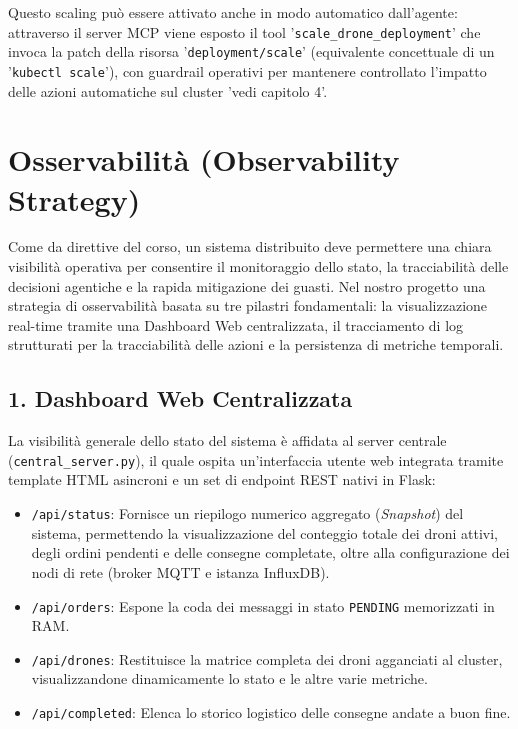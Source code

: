 Questo scaling può essere attivato anche in modo automatico dall’agente: attraverso il server MCP viene esposto il tool '\texttt{scale\_drone\_deployment}' che invoca la patch della risorsa '\texttt{deployment/scale}' (equivalente concettuale di un '\texttt{kubectl scale}'), con guardrail operativi per mantenere controllato l'impatto delle azioni automatiche sul cluster 'vedi capitolo 4'.

\section{Osservabilità (Observability Strategy)}
\label{sec:osservabilita}
Come da direttive del corso, un sistema distribuito deve permettere una chiara visibilità operativa per consentire il monitoraggio dello stato, la tracciabilità delle decisioni agentiche e la rapida mitigazione dei guasti. Nel nostro progetto una strategia di osservabilità basata su tre pilastri fondamentali: la visualizzazione real-time tramite una Dashboard Web centralizzata, il tracciamento di log strutturati per la tracciabilità delle azioni e la persistenza di metriche temporali.

\subsection*{1. Dashboard Web Centralizzata}
La visibilità generale dello stato del sistema è affidata al server centrale (\texttt{central\_server.py}), il quale ospita un'interfaccia utente web integrata tramite template HTML asincroni e un set di endpoint REST nativi in Flask: 

\begin{itemize}
    \item \texttt{/api/status}: Fornisce un riepilogo numerico aggregato (\textit{Snapshot}) del sistema, permettendo la visualizzazione del conteggio totale dei droni attivi, degli ordini pendenti e delle consegne completate, oltre alla configurazione dei nodi di rete (broker MQTT e istanza InfluxDB).
    \item \texttt{/api/orders}: Espone la coda dei messaggi in stato \texttt{PENDING} memorizzati in RAM.
    \item \texttt{/api/drones}: Restituisce la matrice completa dei droni agganciati al cluster, visualizzandone dinamicamente lo stato e le altre varie metriche.
    \item \texttt{/api/completed}: Elenca lo storico logistico delle consegne andate a buon fine.
\end{itemize}

